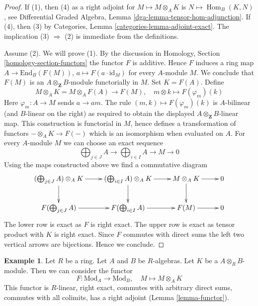 \documentclass{stacks-project}
\theoremstyle{plain}
\theoremstyle{definition}
\newtheorem{example}[subsection]{Example}
\theoremstyle{remark}
\numberwithin{equation}{subsection}
\def\Hom{\mathop{\mathrm{Hom}}\nolimits}
\begin{document}
\begin{proof}
If (1), then (4) as a right adjoint for $M \mapsto M \otimes_A K$
is $N \mapsto \Hom_B(K, N)$, see
Differential Graded Algebra, Lemma \ref{dga-lemma-tensor-hom-adjunction}.
If (4), then (3) by Categories, Lemma \ref{categories-lemma-adjoint-exact}.
The implication (3) $\Rightarrow$ (2) is immediate from the definitions.

\medskip\noindent
Assume (2). We will prove (1). By the discussion in
Homology, Section \ref{homology-section-functors}
the functor $F$ is additive. Hence $F$ induces
a ring map $A \to \text{End}_B(F(M))$, $a \mapsto F(a \cdot \text{id}_M)$
for every $A$-module $M$. We conclude that $F(M)$ is an
$A \otimes_\mathbf{Z} B$-module functorially in $M$.
Set $K = F(A)$. Define
$$
M \otimes_A K = M \otimes_A F(A) \longrightarrow F(M),
\quad m \otimes k \longmapsto F(\varphi_m)(k)
$$
Here $\varphi_m : A \to M$ sends $a \to am$. The rule
$(m, k) \mapsto F(\varphi_m)(k)$ is $A$-bilinear (and $B$-linear
on the right) as required to obtain the displayed
$A \otimes_\mathbf{Z} B$-linear map.
This construction is functorial in $M$, hence defines a transformation
of functors $- \otimes_A K \to F(-)$ which is an isomorphism when
evaluated on $A$. For every $A$-module $M$ we can choose an exact sequence
$$
\bigoplus\nolimits_{j \in J} A \to
\bigoplus\nolimits_{i \in I} A \to
M \to 0
$$
Using the maps constructed above we find a commutative diagram
$$
\xymatrix{
(\bigoplus\nolimits_{j \in J} A) \otimes_A K \ar[r] \ar[d] &
(\bigoplus\nolimits_{i \in I} A) \otimes_A K \ar[r] \ar[d] &
M \otimes_A K \ar[r] \ar[d] &
0 \\
F(\bigoplus\nolimits_{j \in J} A) \ar[r] &
F(\bigoplus\nolimits_{i \in I} A) \ar[r] &
F(M) \ar[r] &  0
}
$$
The lower row is exact as $F$ is right exact.
The upper row is exact as tensor product with $K$ is right exact.
Since $F$ commutes with direct sums the left two vertical arrows
are bijections. Hence we conclude.
\end{proof}

\begin{example}
\label{example-functor-modules}
Let $R$ be a ring. Let $A$ and $B$ be $R$-algebras. Let $K$ be a
$A \otimes_R B$-module. Then we can consider the functor
\begin{equation}
\label{equation-FM-modules}
F : \text{Mod}_A \longrightarrow \text{Mod}_B,\quad
M \longmapsto M \otimes_A K
\end{equation}
This functor is $R$-linear, right exact,
commutes with arbitrary direct sums, commutes
with all colimits, has a right adjoint (Lemma \ref{lemma-functor}).
\end{example}
\end{document}
